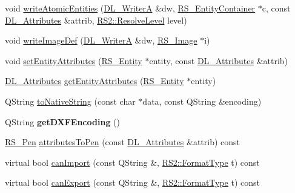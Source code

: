 \begin{DoxyCompactItemize}
\item 
void \hyperlink{classRS__FilterJWW_a6988186b466b8ea09c511bfa66a115c6}{write\-Atomic\-Entities} (\hyperlink{classDL__WriterA}{D\-L\-\_\-\-Writer\-A} \&dw, \hyperlink{classRS__EntityContainer}{R\-S\-\_\-\-Entity\-Container} $\ast$c, const \hyperlink{classDL__Attributes}{D\-L\-\_\-\-Attributes} \&attrib, \hyperlink{classRS2_a1b2c5e3a3e9d1b03a9564229255faa20}{R\-S2\-::\-Resolve\-Level} level)
\item 
void \hyperlink{classRS__FilterJWW_aef4605eb2f60a58e2fc3b7a8cf79e926}{write\-Image\-Def} (\hyperlink{classDL__WriterA}{D\-L\-\_\-\-Writer\-A} \&dw, \hyperlink{classRS__Image}{R\-S\-\_\-\-Image} $\ast$i)
\item 
void \hyperlink{classRS__FilterJWW_affcaa01711ce1107b889a8c4441052ed}{set\-Entity\-Attributes} (\hyperlink{classRS__Entity}{R\-S\-\_\-\-Entity} $\ast$entity, const \hyperlink{classDL__Attributes}{D\-L\-\_\-\-Attributes} \&attrib)
\item 
\hyperlink{classDL__Attributes}{D\-L\-\_\-\-Attributes} \hyperlink{classRS__FilterJWW_af6025b3d4f7fa5d037e37d5e3bb4a79c}{get\-Entity\-Attributes} (\hyperlink{classRS__Entity}{R\-S\-\_\-\-Entity} $\ast$entity)
\item 
Q\-String \hyperlink{classRS__FilterJWW_aed1f38acbb113122234bde0a9a80868d}{to\-Native\-String} (const char $\ast$data, const Q\-String \&encoding)
\item 
\hypertarget{classRS__FilterJWW_ae793d4bf83972639411bfd57a3bc513d}{Q\-String {\bfseries get\-D\-X\-F\-Encoding} ()}\label{classRS__FilterJWW_ae793d4bf83972639411bfd57a3bc513d}

\item 
\hyperlink{classRS__Pen}{R\-S\-\_\-\-Pen} \hyperlink{classRS__FilterJWW_acf78a793285e334becefb936860ffcfe}{attributes\-To\-Pen} (const \hyperlink{classDL__Attributes}{D\-L\-\_\-\-Attributes} \&attrib) const 
\item 
virtual bool \hyperlink{classRS__FilterJWW_a83ac942daf7b4c674f3f2c03c9dded27}{can\-Import} (const Q\-String \&, \hyperlink{classRS2_a077a6c94c9a0ab9962c4d4a612c7189b}{R\-S2\-::\-Format\-Type} t) const 
\item 
virtual bool \hyperlink{classRS__FilterJWW_a1a9b299728815569759917e40b3b98a7}{can\-Export} (const Q\-String \&, \hyperlink{classRS2_a077a6c94c9a0ab9962c4d4a612c7189b}{R\-S2\-::\-Format\-Type} t) const 
\end{DoxyCompactItemize}
